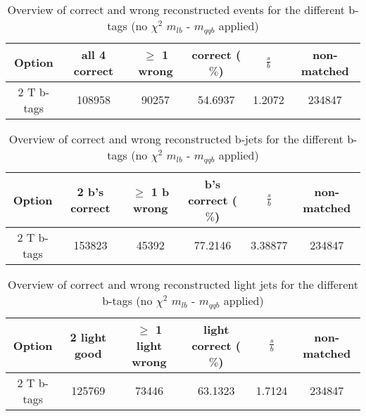 \begin{table}[!h] 
 \begin{tabular}{c|c|c|c|c|c} 
  \textbf{Option} & all 4 correct & $\geq$ 1 wrong       & correct ($\%$)       & $\frac{s}{b}$ & non-matched \\ \hline 
  2 T b-tags              & 108958 & 90257 & 54.6937 & 1.2072 & 234847\\ 
 \end{tabular} 
 \caption{Overview of correct and wrong reconstructed events for the different b-tags (no $\chi^{2}$ $m_{lb}$ - $m_{qqb}$ applied)}
\end{table} 
 
\begin{table}[!h] 
 \begin{tabular}{c|c|c|c|c|c} 
  \textbf{Option} & 2 b's correct & $\geq$ 1 b wrong     & b's correct ($\%$)   & $\frac{s}{b}$ & non-matched \\ \hline 
  2 T b-tags              & 153823 & 45392 & 77.2146 & 3.38877 & 234847\\ 
 \end{tabular} 
 \caption{Overview of correct and wrong reconstructed b-jets for the different b-tags (no $\chi^{2}$ $m_{lb}$ - $m_{qqb}$ applied)}
\end{table} 
 
\begin{table}[!h] 
 \begin{tabular}{c|c|c|c|c|c} 
  \textbf{Option} & 2 light good  & $\geq$ 1 light wrong & light correct ($\%$) & $\frac{s}{b}$ & non-matched \\ \hline 
  2 T b-tags              & 125769 & 73446 & 63.1323 & 1.7124 & 234847\\ 
 \end{tabular} 
 \caption{Overview of correct and wrong reconstructed light jets for the different b-tags (no $\chi^{2}$ $m_{lb}$ - $m_{qqb}$ applied)}
\end{table} 
 
